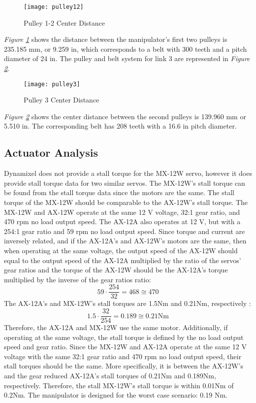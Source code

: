 \begin{figure}[htp]
  \center
  \texttt{[image: pulley12]}
  \caption{Pulley 1-2 Center Distance}
  \label{fig:pulley12}
\end{figure}
\emph{Figure \ref{fig:pulley12}} shows the distance between the manipulator’s first two pulleys is 235.185 mm, or 9.259 in, which corresponds to a belt with 300 teeth and a pitch diameter of 24 in. The pulley and belt system for link 3 are represented in \emph{Figure \ref{fig:pulley3}}.

\begin{figure}[htp]
  \center
  \texttt{[image: pulley3]}
  \caption{Pulley 3 Center Distance}
  \label{fig:pulley3}
\end{figure}
\emph{Figure \ref{fig:pulley3}} shows the center distance between the second pulleys is 139.960 mm or 5.510 in. The corresponding belt has 208 teeth with a 16.6 in pitch diameter.
\subsection{Actuator Analysis}
Dynamixel does not provide a stall torque for the MX-12W servo, however it does provide stall torque data for two similar servos. The MX-12W’s stall torque can be found from the stall torque data since the motors are the same. The stall torque of the MX-12W should be comparable to the AX-12W’s stall torque. The MX-12W and AX-12W operate at the same 12 V voltage, 32:1 gear ratio, and 470 rpm no load output speed. The AX-12A also operates at 12 V, but with a 254:1 gear ratio and 59 rpm no load output speed. Since torque and current are inversely related, and if the AX-12A’s and AX-12W’s motors are the same, then when operating at the same voltage, the output speed of the AX-12W should equal to the output speed of the AX-12A multiplied by the ratio of the servos’ gear ratios and the torque of the AX-12W should be the AX-12A’s torque multiplied by the inverse of the gear ratios ratio:
\[ 59\cdot\frac{254}{32}=468 \cong 470 \]
The AX-12A’s and MX-12W’s stall torques are 1.5Nm and 0.21Nm, respectively \cite{dyna}:
\[ 1.5\cdot\frac{32}{254}=0.189\cong0.21\text{Nm} \]
Therefore, the AX-12A and MX-12W use the same motor. Additionally, if operating at the same voltage, the stall torque is defined by the no load output speed and gear ratio. Since the MX-12W and AX-12A operate at the same 12 V voltage with the same 32:1 gear ratio and 470 rpm no load output speed, their stall torques should be the same. More specifically, it is between the AX-12W’s and the gear reduced AX-12A’s stall torques of 0.21Nm and 0.189Nm, respectively. Therefore, the stall MX-12W’s stall torque is within 0.01Nm of 0.2Nm. The manipulator is designed for the worst case scenario: 0.19 Nm.


